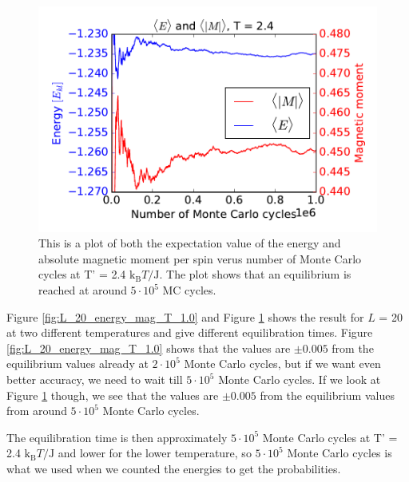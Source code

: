 \begin{figure}[H]
\includegraphics[width=\linewidth]{../results/4c/En_mag_T2_4}\caption{This is a plot of both the expectation value of the energy and absolute magnetic moment per spin verus number of Monte Carlo cycles at T' = 2.4 $\text{k}_\text{B}T/\text{J}$. The plot shows that an equilibrium is reached at around $5 \cdot 10^{5}$ MC cycles.}\label{fig:L_20_energy_mag_T_2.4}
\end{figure}


Figure \ref{fig:L_20_energy_mag_T_1.0} and Figure \ref{fig:L_20_energy_mag_T_2.4} shows the result for $L$ = 20 at two different temperatures and give different equilibration times. Figure \ref{fig:L_20_energy_mag_T_1.0} shows that the values are $\pm 0.005$ from the equilibrium values already at $2\cdot 10^5$ Monte Carlo cycles, but if we want even better accuracy, we need to wait till $5\cdot 10^5$ Monte Carlo cycles. If we look at Figure \ref{fig:L_20_energy_mag_T_2.4} though, we see that the values are $\pm 0.005$ from the equilibrium values from around $5\cdot 10^5$ Monte Carlo cycles.

The equilibration time is then approximately $5\cdot 10^5$ Monte Carlo cycles at T' = 2.4 $\text{k}_\text{B}T/\text{J}$ and lower for the lower temperature, so $5\cdot 10^5$ Monte Carlo cycles is what we used when we counted the energies to get the probabilities. 

